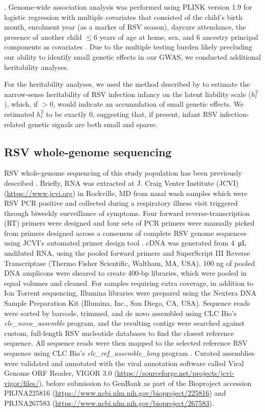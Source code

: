 \documentclass{article} %
\begin{document}
\citep{yang2011gcta}.
Genome-wide association analysis was performed using PLINK version 1.9 for logistic regression with multiple covariates that consisted of the child's birth month, enrolment year (as a marker of RSV season), daycare attendance, the presence of another child $\le 6$ years of age at home, sex, and 6 ancestry principal components as covariates
\citep{purcell2007plink}.
Due to the multiple testing burden likely precluding our ability to identify small genetic effects in our GWAS, we conducted additional heritability analyses.

For the heritability analyses, we used the method described by \citet{golan2014measuring} to estimate the narrow-sense heritability of RSV infection infancy on the latent liability scale ($h_l^2$), which, if  $> 0$, would indicate an accumulation of small genetic effects.
We estimated $h_l^2$ to be exactly 0, suggesting that, if present, infant RSV infection-related genetic signals are both small and sparse. 

\subsection{RSV whole-genome sequencing}
RSV whole-genome sequencing of this study population has been previously described 
\citep{schobel_respiratory_2016}.
Briefly, RNA was extracted at J. Craig Venter Institute (JCVI) (\url{https://www.jcvi.org}) in Rockville, MD from nasal wash samples which were RSV PCR positive and collected during a respiratory illness visit triggered through biweekly surveillance of symptoms. 
Four forward reverse-transcription (RT) primers were designed and four sets of PCR primers were manually picked from primers designed across a consensus of complete RSV genome sequences using JCVI’s automated primer design tool
\citep{li_automated_2012}.
cDNA was generated from \SI{4}{\micro\liter}  undiluted RNA, using the pooled forward primers and SuperScript III Reverse Transcriptase (Thermo Fisher Scientific, Waltham, MA, USA). 
100 ng of pooled DNA amplicons were sheared to create 400-bp libraries, which were pooled in equal volumes and cleaned. 
For samples requiring extra coverage, in addition to Ion Torrent sequencing, Illumina libraries were prepared using the Nextera DNA Sample Preparation Kit (Illumina, Inc., San Diego, CA, USA). 
Sequence reads were sorted by barcode, trimmed, and de novo assembled using CLC Bio's \textit{clc\_novo\_assemble} program, and the resulting contigs were searched against custom, full-length RSV nucleotide databases to find the closest reference sequence. 
All sequence reads were then mapped to the selected reference RSV sequence using CLC Bio's \textit{clc\_ref\_assemble\_long} program 
\citep{bioWhite2016}.
Curated assemblies were validated and annotated with the viral annotation software called Viral Genome ORF Reader, VIGOR 3.0 (\url{https://sourceforge.net/projects/jcvi-vigor/files/}), before submission to GenBank as part of the Bioproject accession PRJNA225816 (\url{https://www.ncbi.nlm.nih.gov/bioproject/225816})
\citep{wang_vigor_2012} 
and PRJNA267583 (\url{https://www.ncbi.nlm.nih.gov/bioproject/267583}).
\end{document}
